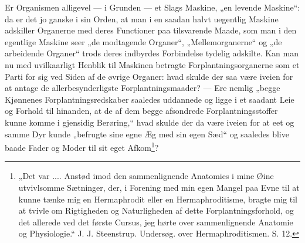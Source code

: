 \documentclass[12pt,a4paper]{book}
\begin{document}
Er Organismen alligevel --- i Grunden --- et Slags Maskine, „en levende
Maskine“: da er det jo ganske i sin Orden, at man i en saadan halvt
uegentlig Maskine adskiller Organerne med deres Functioner paa
tilsvarende Maade, som man i den egentlige Maskine seer „de modtagende
Organer“, „Mellemorganerne“ og „de arbeidende Organer“ trods deres
indbyrdes Forbindelse tydelig adskilte. Kan man nu med uvilkaarligt
Henblik til Maskinen betragte Forplantningsorganerne som et Parti for sig
ved Siden af de øvrige Organer: hvad skulde der saa være iveien for at
antage de allerbesynderligste Forplantningsmaader? --- Ere nemlig „begge
Kjønnenes Forplantningsredskaber saaledes uddannede og ligge i et saadant
Leie og Forhold til hinanden, at de af dem begge afsondrede
Forplantningsstoffer kunne komme i gjensidig Berøring,“ hvad skulde der
da være iveien for at eet og samme Dyr kunde „befrugte sine egne Æg med
sin egen Sæd“ og saaledes blive baade Fader og Moder til sit eget
Afkom\footnote{„Det var .... Anstød imod den sammenlignende Anatomies i
mine Øine utvivlsomme Sætninger, der, i Forening med min egen Mangel paa
Evne til at kunne tænke mig en Hermaphrodit eller en Hermaphroditisme,
bragte mig til at tvivle om Rigtigheden og Naturligheden af dette
Forplantningsforhold, og det allerede ved det første Cursus, jeg hørte
over sammenlignende Anatomie og Physiologie.“ J. J. Steenstrup.
Undersøg. over Hermaphroditismen. S. 12.}?
\end{document}
